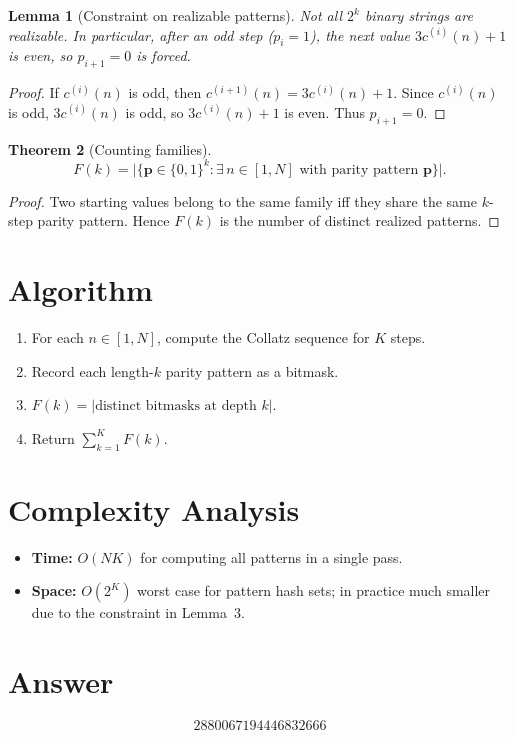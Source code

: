 \documentclass[12pt]{article}
\newtheorem{theorem}{Theorem}
\newtheorem{lemma}[theorem]{Lemma}
\begin{document}
\begin{lemma}[Constraint on realizable patterns]
Not all $2^k$ binary strings are realizable. In particular, after an odd step ($p_i = 1$), the next value $3 c^{(i)}(n) + 1$ is even, so $p_{i+1} = 0$ is forced.
\end{lemma}

\begin{proof}
If $c^{(i)}(n)$ is odd, then $c^{(i+1)}(n) = 3 c^{(i)}(n) + 1$. Since $c^{(i)}(n)$ is odd, $3 c^{(i)}(n)$ is odd, so $3 c^{(i)}(n) + 1$ is even. Thus $p_{i+1} = 0$.
\end{proof}

\begin{theorem}[Counting families]
\[
F(k) = \bigl|\{\mathbf{p} \in \{0,1\}^k : \exists\, n \in [1, N] \text{ with parity pattern } \mathbf{p}\}\bigr|.
\]
\end{theorem}

\begin{proof}
Two starting values belong to the same family iff they share the same $k$-step parity pattern. Hence $F(k)$ is the number of distinct realized patterns.
\end{proof}

\section{Algorithm}
\begin{enumerate}
\item For each $n \in [1, N]$, compute the Collatz sequence for $K$ steps.
\item Record each length-$k$ parity pattern as a bitmask.
\item $F(k) = |\text{distinct bitmasks at depth } k|$.
\item Return $\sum_{k=1}^{K} F(k)$.
\end{enumerate}

\section{Complexity Analysis}
\begin{itemize}
\item \textbf{Time:} $O(NK)$ for computing all patterns in a single pass.
\item \textbf{Space:} $O(2^K)$ worst case for pattern hash sets; in practice much smaller due to the constraint in Lemma~3.
\end{itemize}

\section{Answer}

\[
\boxed{2880067194446832666}
\]
\end{document}
